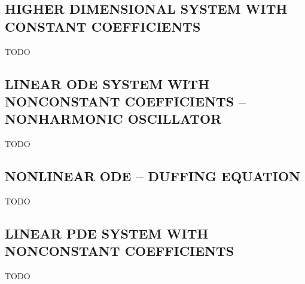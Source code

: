 \documentclass[accepted]{uai2023}
\begin{document}
\subsection{HIGHER DIMENSIONAL SYSTEM WITH CONSTANT COEFFICIENTS} \label{section:high-dimension}
    TODO

\subsection{LINEAR ODE SYSTEM WITH NONCONSTANT COEFFICIENTS -- NONHARMONIC OSCILLATOR} \label{section:experiment-nonharmonic-oscillator}
    TODO

\subsection{NONLINEAR ODE -- DUFFING EQUATION} \label{section:experiment-duffing}
    TODO

\subsection{LINEAR PDE SYSTEM WITH NONCONSTANT COEFFICIENTS } \label{section:experiment-attractor}
    TODO



\end{document}
